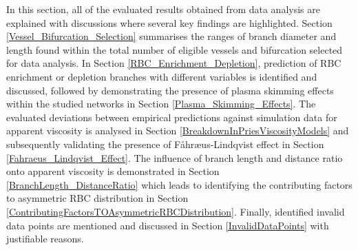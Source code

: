 \noindent In this section, all of the evaluated results obtained from data analysis are explained with discussions where several key findings are highlighted. Section \ref{Vessel_Bifurcation_Selection} summarises the ranges of branch diameter and length found within the total number of eligible vessels and bifurcation selected for data analysis. In Section \ref{RBC_Enrichment_Depletion}, prediction of RBC enrichment or depletion branches with different variables is identified and discussed, followed by demonstrating the presence of plasma skimming effects within the studied networks in Section \ref{Plasma_Skimming_Effects}. The evaluated deviations between empirical predictions against simulation data for apparent viscosity is analysed in Section \ref{BreakdownInPriesViscosityModels} and subsequently validating the presence of F{\aa}hr{\ae}us-Lindqvist effect in Section \ref{Fahraeus_Lindqvist_Effect}. The influence of branch length and distance ratio onto apparent viscosity is demonstrated in Section \ref{BranchLength_DistanceRatio} which leads to identifying the contributing factors to asymmetric RBC distribution in Section \ref{ContributingFactorsTOAsymmetricRBCDistribution}. Finally, identified invalid data points are mentioned and discussed in Section \ref{InvalidDataPoints} with justifiable reasons. 



